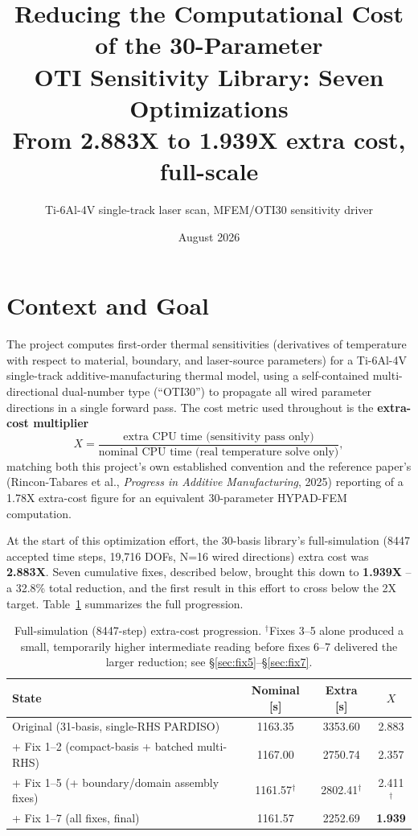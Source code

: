 \documentclass[11pt]{article}
\title{\textbf{Reducing the Computational Cost of the 30-Parameter\\
OTI Sensitivity Library: Seven Optimizations}\\[0.3em]
\large From 2.883X to 1.939X extra cost, full-scale}
\author{Ti-6Al-4V single-track laser scan, MFEM/OTI30 sensitivity driver}
\date{August 2026}
\begin{document}
\maketitle

\section{Context and Goal}

The project computes first-order thermal sensitivities (derivatives of
temperature with respect to material, boundary, and laser-source
parameters) for a Ti-6Al-4V single-track additive-manufacturing thermal
model, using a self-contained multi-directional dual-number type
(``OTI30'') to propagate all wired parameter directions in a single
forward pass. The cost metric used throughout is the \textbf{extra-cost
multiplier}
\[
X = \frac{\text{extra CPU time (sensitivity pass only)}}{\text{nominal CPU time (real temperature solve only)}},
\]
matching both this project's own established convention and the
reference paper's (Rincon-Tabares et al., \emph{Progress in Additive
Manufacturing}, 2025) reporting of a 1.78X extra-cost figure for an
equivalent 30-parameter HYPAD-FEM computation.

At the start of this optimization effort, the 30-basis library's
full-simulation (8447 accepted time steps, 19{,}716 DOFs, N=16 wired
directions) extra cost was \textbf{2.883X}. Seven cumulative fixes,
described below, brought this down to \textbf{1.939X} -- a 32.8\% total
reduction, and the first result in this effort to cross below the 2X
target. Table~\ref{tab:progression} summarizes the full progression.

\begin{table}[h]
\centering
\begin{tabular}{@{}lccc@{}}
\toprule
State & Nominal [s] & Extra [s] & $X$ \\
\midrule
Original (31-basis, single-RHS PARDISO) & 1163.35 & 3353.60 & 2.883 \\
+ Fix 1--2 (compact-basis + batched multi-RHS) & 1167.00 & 2750.74 & 2.357 \\
+ Fix 1--5 (+ boundary/domain assembly fixes) & 1161.57$^\dagger$ & 2802.41$^\dagger$ & 2.411$^\dagger$ \\
+ Fix 1--7 (all fixes, final) & 1161.57 & 2252.69 & \textbf{1.939} \\
\bottomrule
\end{tabular}
\caption{Full-simulation (8447-step) extra-cost progression. $^\dagger$Fixes
3--5 alone produced a small, temporarily higher intermediate reading before
fixes 6--7 delivered the larger reduction; see \S\ref{sec:fix5}--\S\ref{sec:fix7}.}
\label{tab:progression}
\end{table}
\end{document}
